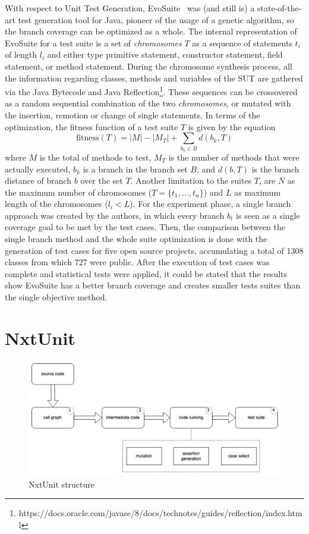 \documentclass[%
  chapterprefix=false,%
  open=right,%
  twoside=true,%
  paper=a4,%
  logofile={Figures/logo.png},%
  thesistype=master,%
  UKenglish,%
]{se2thesis}
\begin{document}
With respect to Unit Test Generation, EvoSuite~\cite{DBLP:conf/qsic/FraserA11} was (and still is) a state-of-the-art test generation tool for Java, pioneer of the usage of a genetic algorithm, so the branch coverage can be optimized as a whole.
The internal representation of EvoSuite for a test suite is a set of \textit{chromosomes} \(T\) as a sequence of statements \(t_i\) of length \(l_i\) and either type primitive statement, constructor statement, field statement, or method statement.
During the chromosome synthesis process, all the information regarding classes, methods and variables of the SUT are gathered via the Java Bytecode and Java Reflection\footnote{https://docs.oracle.com/javase/8/docs/technotes/guides/reflection/index.html}.
These sequences can be crossovered as a random sequential combination of the two \textit{chromosomes}, or mutated with the insertion, remotion or change of single statements.
In terms of the optimization, the fitness function of a test suite $T$ is given by the equation
\[ \text{fitness}(T) = |M| - |M_T| + \sum_{b_k \in B} d(b_k, T) \]
where $M$ is the total of methods to test, \(M_T\) is the number of methods that were actually executed, \(b_k\) is a branch in the branch set \(B\), and \(d(b, T)\) is the branch distance of branch \(b\) over the set \(T\).
Another limitation to the suites \(T\), are \(N\) as the maximum number of chromosomes (\(T = \{t_1, \dots , t_n\}\)) and \(L\) as maximum length of the chromosomes (\(l_i < L\)).
For the experiment phase, a single branch approach was created by the authors, in which every branch \(b_t\) is seen as a single coverage goal to be met by the test cases.
Then, the comparison between the single branch method and the whole suite optimization is done with the generation of test cases for five open source projects, accumulating a total of 1308 classes from which 727 were public.
After the execution of test cases was complete and statistical tests were applied, it could be stated that the results show EvoSuite has a better branch coverage and creates smaller tests suites than the single objective method.

\section{NxtUnit}

\begin{figure}[bt]
  \centering
  \includegraphics[width=.99\textwidth]{Figures/nxtunit.png}
  \caption{NxtUnit structure}\label{fig:nxt}
\end{figure}
\end{document}
